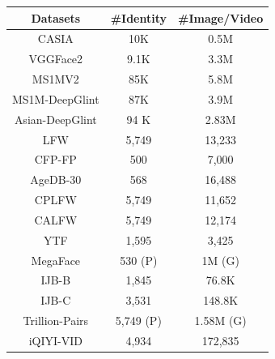 \documentclass[10pt,twocolumn,letterpaper]{article}
\begin{document}
\begin{table}[t!]
\begin{center}
\begin{tabular}{c|c|c}
\hline
 Datasets   & \#Identity & \#Image/Video\\
\hline
CASIA \cite{yi2014learning} & 10K  & 0.5M  \\
VGGFace2 \cite{cao2017vggface2}     & 9.1K & 3.3M  \\
MS1MV2                             & 85K  & 5.8M \\   
MS1M-DeepGlint \cite{glintweb}   & 87K  & 3.9M \\
Asian-DeepGlint \cite{glintweb}     & 94 K  & 2.83M\\
\hline
LFW \cite{huang2007labeled}   & 5,749  & 13,233 \\
CFP-FP \cite{sengupta2016frontal} & 500 & 7,000\\
AgeDB-30 \cite{Moschoglou2017AgeDB} & 568 & 16,488 \\
CPLFW \cite{zheng2018cross} & 5,749  & 11,652 \\
CALFW \cite{zheng2017cross} & 5,749  & 12,174 \\
YTF   \cite{wolf2011face} & 1,595  & 3,425 \\ 
\hline
MegaFace \cite{kemelmacher2016megaface} & 530 (P) & 1M (G) \\
IJB-B    \cite{whitelam2017iarpa}       & 1,845   & 76.8K \\
IJB-C    \cite{maze2018iarpa}           & 3,531   & 148.8K \\
Trillion-Pairs \cite{glintweb}          & 5,749 (P) & 1.58M (G)\\
iQIYI-VID \cite{IQIYI2018}              & 4,934   & 172,835\\

\end{tabular}
\end{center}
\end{table}
\end{document}
